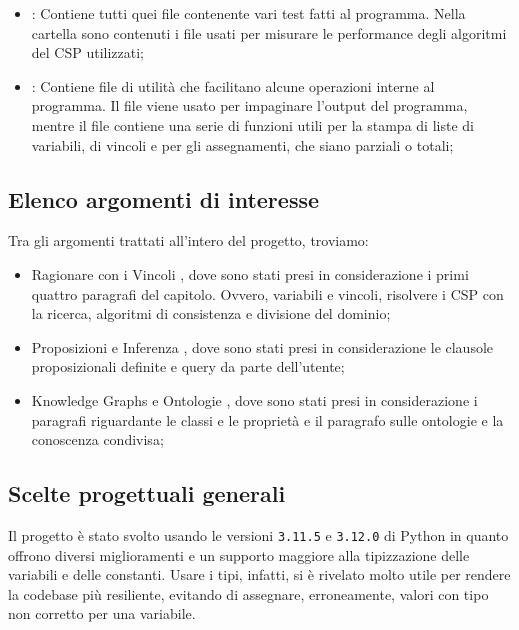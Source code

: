 \documentclass[12pt, letterpaper]{article}
\begin{document}
\begin{itemize}
      \item {}: Contiene tutti quei file contenente vari test fatti al programma.
            Nella cartella  sono contenuti i file usati per misurare le
            performance degli algoritmi del CSP utilizzati;

      \item {}: Contiene file di utilità che facilitano alcune operazioni interne al programma.
            Il file  viene usato per impaginare l'output del programma, mentre il file
             contiene una serie di funzioni utili per la stampa di liste di variabili, di vincoli
            e per gli assegnamenti, che siano parziali o totali;
\end{itemize}

\subsection{Elenco argomenti di interesse}

Tra gli argomenti trattati all'intero del progetto, troviamo:

\begin{itemize}
      \item Ragionare con i Vincoli \cite{cap-4-libro}, dove sono stati presi in considerazione i primi quattro paragrafi del
            capitolo. Ovvero,  variabili e vincoli, risolvere i CSP con la ricerca, algoritmi
            di consistenza e divisione del dominio;

      \item Proposizioni e Inferenza \cite{cap-5-libro}, dove sono stati presi in considerazione le clausole
            proposizionali definite e query da parte dell'utente;

      \item Knowledge Graphs e Ontologie \cite{cap-16-libro}, dove sono stati presi in considerazione i paragrafi
            riguardante le classi e le proprietà e il paragrafo sulle ontologie e la conoscenza condivisa;


\end{itemize}


\subsection{Scelte progettuali generali}

Il progetto è stato svolto usando le versioni \texttt{3.11.5} e \texttt{3.12.0} di Python in quanto offrono diversi
miglioramenti e un supporto maggiore alla tipizzazione delle variabili e delle constanti.
Usare i tipi, infatti, si è rivelato molto utile per rendere la codebase più resiliente, evitando di
assegnare, erroneamente, valori con tipo non corretto per una variabile. \\
\end{document}
